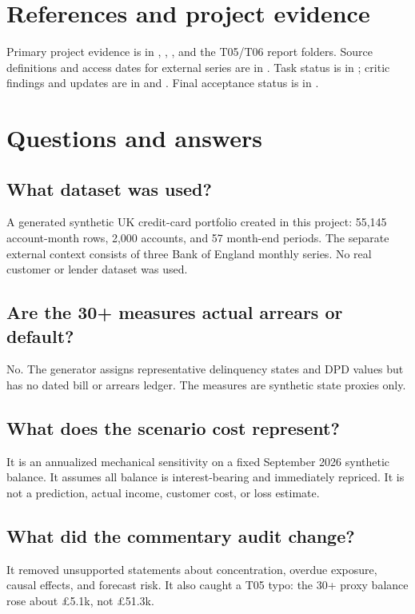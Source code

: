 \documentclass[11pt]{article}
\begin{document}
\section{References and project evidence}

Primary project evidence is in , , , and the T05/T06 report folders. Source definitions and access dates for external series are in . Task status is in ; critic findings and updates are in  and . Final acceptance status is in .

\newpage
\section{Questions and answers}

\subsection*{What dataset was used?}
A generated synthetic UK credit-card portfolio created in this project: 55,145 account-month rows, 2,000 accounts, and 57 month-end periods. The separate external context consists of three Bank of England monthly series. No real customer or lender dataset was used.

\subsection*{Are the 30+ measures actual arrears or default?}
No. The generator assigns representative delinquency states and DPD values but has no dated bill or arrears ledger. The measures are synthetic state proxies only.

\subsection*{What does the scenario cost represent?}
It is an annualized mechanical sensitivity on a fixed September 2026 synthetic balance. It assumes all balance is interest-bearing and immediately repriced. It is not a prediction, actual income, customer cost, or loss estimate.

\subsection*{What did the commentary audit change?}
It removed unsupported statements about concentration, overdue exposure, causal effects, and forecast risk. It also caught a T05 typo: the 30+ proxy balance rose about £5.1k, not £51.3k.
\end{document}
